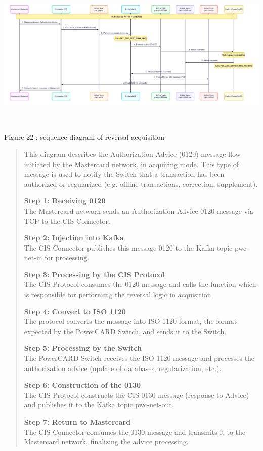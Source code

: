 \documentclass[12pt,a4paper]{report}
\begin{document}
\includegraphics[width=7.05923in,height=2.81006in]{vertopal_d1b0b2209edd4c6aa8254f57daa0953b/media/image41.png}

\protect\hypertarget{_Toc201954498}{}{}Figure 22 : sequence diagram of
reversal acquisition

\begin{quote}
This diagram describes the Authorization Advice (0120) message flow
initiated by the Mastercard network, in acquiring mode. This type of
message is used to notify the Switch that a transaction has been
authorized or regularized (e.g. offline transactions, correction,
supplement).

\textbf{Step 1: Receiving 0120}\\
The Mastercard network sends an Authorization Advice 0120 message via
TCP to the CIS Connector.

\textbf{Step 2: Injection into Kafka}\\
The CIS Connector publishes this message 0120 to the Kafka topic
pwc-net-in for processing.

\textbf{Step 3: Processing by the CIS Protocol}\\
The CIS Protocol consumes the 0120 message and calls the function which
is responsible for performing the reversal logic in acquisition.

\textbf{Step 4: Convert to ISO 1120}\\
The protocol converts the message into ISO 1120 format, the format
expected by the PowerCARD Switch, and sends it to the Switch.

\textbf{Step 5: Processing by the Switch}\\
The PowerCARD Switch receives the ISO 1120 message and processes the
authorization advice (update of databases, regularization, etc.).

\textbf{Step 6: Construction of the 0130}\\
The CIS Protocol constructs the CIS 0130 message (response to Advice)
and publishes it to the Kafka topic pwc-net-out.

\textbf{Step 7: Return to Mastercard}\\
The CIS Connector consumes the 0130 message and transmits it to the
Mastercard network, finalizing the advice processing.
\end{quote}
\end{document}
